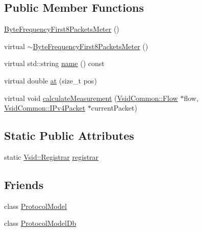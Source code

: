 \subsection*{Public Member Functions}
\begin{DoxyCompactItemize}
\item 
\hyperlink{class_vsid_1_1_byte_frequency_first8_packets_meter_ad69f17ee40fc0a1b142ad4830a2dea57}{Byte\-Frequency\-First8\-Packets\-Meter} ()
\item 
virtual \hyperlink{class_vsid_1_1_byte_frequency_first8_packets_meter_ae5dc5f1e4d2a61cb89f5c6fa0a0ce8ad}{$\sim$\-Byte\-Frequency\-First8\-Packets\-Meter} ()
\item 
virtual std\-::string \hyperlink{class_vsid_1_1_byte_frequency_first8_packets_meter_a9ef45a8d4e453ac5b67260c186cefdce}{name} () const 
\item 
virtual double \hyperlink{class_vsid_1_1_byte_frequency_first8_packets_meter_a882a4412aaf87b7c9b14aa6b71e00534}{at} (size\-\_\-t pos)
\item 
virtual void \hyperlink{class_vsid_1_1_byte_frequency_first8_packets_meter_a0c66abfae09225bbe83e3da9a07c14fb}{calculate\-Measurement} (\hyperlink{class_vsid_common_1_1_flow}{Vsid\-Common\-::\-Flow} $\ast$flow, \hyperlink{class_vsid_common_1_1_i_pv4_packet}{Vsid\-Common\-::\-I\-Pv4\-Packet} $\ast$current\-Packet)
\end{DoxyCompactItemize}
\subsection*{Static Public Attributes}
\begin{DoxyCompactItemize}
\item 
static \hyperlink{class_vsid_1_1_registrar}{Vsid\-::\-Registrar} \hyperlink{class_vsid_1_1_byte_frequency_first8_packets_meter_a1f57fc0af2e1700109db9e2d12e63745}{registrar}
\end{DoxyCompactItemize}
\subsection*{Friends}
\begin{DoxyCompactItemize}
\item 
class \hyperlink{class_vsid_1_1_byte_frequency_first8_packets_meter_a80219b863d4ff3456933d16bc5f73f45}{Protocol\-Model}
\item 
class \hyperlink{class_vsid_1_1_byte_frequency_first8_packets_meter_a3c0d389e7a9476b06313d8fb9ca9fe68}{Protocol\-Model\-Db}
\end{DoxyCompactItemize}
